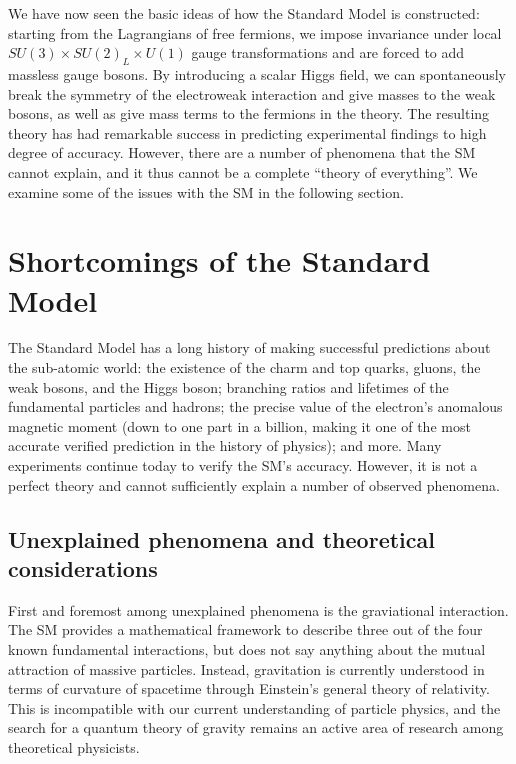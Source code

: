 We have now seen the basic ideas of how the Standard Model is constructed: starting from the Lagrangians
of free fermions, we impose invariance under local $SU(3)\times SU(2)_L\times U(1)$ gauge transformations
and are forced to add massless gauge bosons. By introducing a scalar Higgs field, we can spontaneously 
break the symmetry of the electroweak interaction and give masses to the weak bosons, as well as
give mass terms to the fermions in the theory. The resulting theory has had remarkable success in
predicting experimental findings to high degree of accuracy. However, there are a number of phenomena
that the SM cannot explain, and it thus cannot be a complete ``theory of everything''. We examine some
of the issues with the SM in the following section.


\section{Shortcomings of the Standard Model}
The Standard Model has a long history of making successful predictions about the sub-atomic
world: the existence of the charm and top quarks, gluons, the weak bosons, and the Higgs boson;
branching ratios and lifetimes of the fundamental particles and hadrons; the precise value of the
electron's anomalous magnetic moment (down to one part in a billion, making it one of the most accurate
verified prediction in the history of physics); and more. Many experiments continue today to verify the SM's
accuracy. However, it is not a perfect theory and cannot sufficiently explain a number of observed
phenomena.

\subsection{Unexplained phenomena and theoretical considerations}

First and foremost among unexplained phenomena is the graviational interaction. 
The SM provides a mathematical framework to describe
three out of the four known fundamental interactions, but does not say anything about the mutual attraction
of massive particles. Instead, gravitation is currently understood in terms of curvature of spacetime
through Einstein's general theory of relativity. This is incompatible with our current understanding of
particle physics, and the search for a quantum theory of gravity remains an active area
of research among theoretical physicists.

